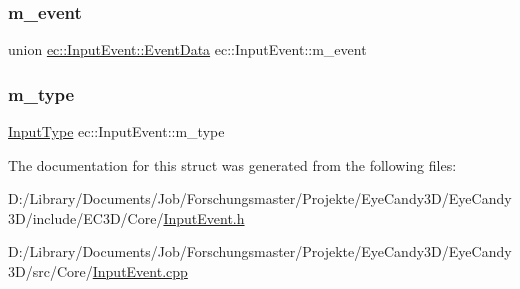 \subsubsection{\texorpdfstring{m\+\_\+event}{m\_event}}
{\footnotesize\ttfamily union \mbox{\hyperlink{unionec_1_1_input_event_1_1_event_data}{ec\+::\+Input\+Event\+::\+Event\+Data}}  ec\+::\+Input\+Event\+::m\+\_\+event}

\mbox{\label{structec_1_1_input_event_a07aadaf18da2952478b803bbd4122bb7}} 
\subsubsection{\texorpdfstring{m\+\_\+type}{m\_type}}
{\footnotesize\ttfamily \mbox{\hyperlink{namespaceec_a5de6bdb8c4b2ed6e590e721ec998f964}{Input\+Type}} ec\+::\+Input\+Event\+::m\+\_\+type}



The documentation for this struct was generated from the following files\+:\begin{DoxyCompactItemize}
\item 
D\+:/\+Library/\+Documents/\+Job/\+Forschungsmaster/\+Projekte/\+Eye\+Candy3\+D/\+Eye\+Candy3\+D/include/\+E\+C3\+D/\+Core/\mbox{\hyperlink{_input_event_8h}{Input\+Event.\+h}}\item 
D\+:/\+Library/\+Documents/\+Job/\+Forschungsmaster/\+Projekte/\+Eye\+Candy3\+D/\+Eye\+Candy3\+D/src/\+Core/\mbox{\hyperlink{_input_event_8cpp}{Input\+Event.\+cpp}}\end{DoxyCompactItemize}
